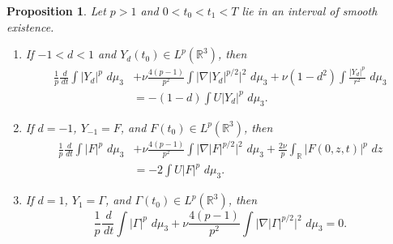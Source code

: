 \documentclass[11pt]{article}
\numberwithin{equation}{section}
\newtheorem{proposition}[proposition]{Proposition}
\theoremstyle{definition}
\newcommand{\R}{\mathbb R}
\newcommand{\dd}{\,d}
\begin{document}
\begin{proposition}\label{prop:Ydp}
Let $p>1$ and $0<t_0<t_1<T$ lie in an interval of smooth existence.
\begin{enumerate}[label=\rm(\alph*)]
\item If $-1<d<1$ and $Y_d(t_0)\in L^p(\R^3)$, then
\begin{align}\label{eq:Ydp-energy}
 \frac1p\frac{\dd}{\dd t}\int |Y_d|^p\,\dd\mu_3
 &+\nu\frac{4(p-1)}{p^2}\int\bigl|\nabla |Y_d|^{p/2}\bigr|^2\,\dd\mu_3
 +\nu(1-d^2)\int\frac{|Y_d|^p}{r^2}\,\dd\mu_3 \\
 &=-(1-d)\int U|Y_d|^p\,\dd\mu_3.
\end{align}
\item If $d=-1$, $Y_{-1}=F$, and $F(t_0)\in L^p(\R^3)$, then
\begin{align}\label{eq:Fp}
 \frac1p\frac{\dd}{\dd t}\int |F|^p\,\dd\mu_3
 &+\nu\frac{4(p-1)}{p^2}\int\bigl|\nabla |F|^{p/2}\bigr|^2\,\dd\mu_3
 +\frac{2\nu}{p}\int_\R |F(0,z,t)|^p\,\dd z \\
 &=-2\int U|F|^p\,\dd\mu_3.
\end{align}
\item If $d=1$, $Y_1=\Gamma$, and $\Gamma(t_0)\in L^p(\R^3)$, then
\begin{equation}\label{eq:Gamma-p}
 \frac1p\frac{\dd}{\dd t}\int |\Gamma|^p\,\dd\mu_3
 +\nu\frac{4(p-1)}{p^2}\int\bigl|\nabla |\Gamma|^{p/2}\bigr|^2\,\dd\mu_3=0.
\end{equation}
\end{enumerate}
\end{proposition}
\end{document}
